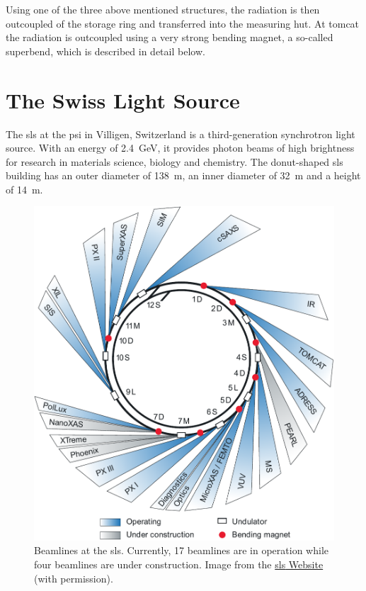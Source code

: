 Using one of the three above mentioned structures, the radiation is then outcoupled of the storage ring and transferred into the measuring hut. At \ac{tomcat} the radiation is outcoupled using a very strong bending magnet, a so-called superbend, which is described in detail below.

\section{The Swiss Light Source}
The \acl{sls} at the \ac{psi} in Villigen, Switzerland is a third-generation synchrotron light source. With an energy of \SI{2.4}{\giga\electronvolt}, it provides photon beams of high brightness for research in materials science, biology and chemistry. The donut-shaped \ac{sls} building has an outer diameter of \SI{138}{\meter}, an inner diameter of \SI{32}{\meter} and a height of \SI{14}{\meter}. 

\renewcommand{\imsize}{0.618\linewidth}%
\begin{figure}%
	\centering
	\includegraphics[width=\imsize]{img/sls_strahllinien_e_innererRing1108_crop_edit}
	\caption[Beamlines at the \acs{sls}]{Beamlines at the \ac{sls}. Currently, 17 beamlines are in operation while four beamlines are under construction. Image from the \href{http://sls.web.psi.ch/view.php/beamlines/}{\ac{sls} Website}~\cite{wwwsls} (with permission).}
	\label{fig:beamlines}
\end{figure}%

